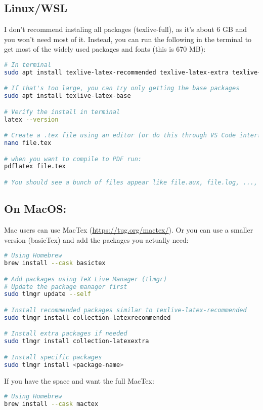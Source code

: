 \documentclass[12pt]{article}
\begin{document}
\subsection{Linux/WSL}
I don't recommend instaling all packages (texlive-full), as it's about 6 GB and you won't need most of it. Instead, you can run the following in the terminal to get most of the widely used packages and fonts (this is 670 MB):
\begin{lstlisting}[language=bash]
# In terminal
sudo apt install texlive-latex-recommended texlive-latex-extra texlive-fonts-recommended

# If that's too large, you can try only getting the base packages
sudo apt install texlive-latex-base

# Verify the install in terminal
latex --version

# Create a .tex file using an editor (or do this through VS Code interface)
nano file.tex

# when you want to compile to PDF run:
pdflatex file.tex

# You should see a bunch of files appear like file.aux, file.log, ..., you can ignore those, and just focus on file.pdf
\end{lstlisting}

\subsection{On MacOS:}
Mac users can use MacTex (\url{https://tug.org/mactex/}).
Or you can use a smaller version (basicTex) and add the packages you actually need:
\begin{lstlisting}[language=bash]
# Using Homebrew
brew install --cask basictex

# Add packages using TeX Live Manager (tlmgr)
# Update the package manager first
sudo tlmgr update --self

# Install recommended packages similar to texlive-latex-recommended
sudo tlmgr install collection-latexrecommended

# Install extra packages if needed
sudo tlmgr install collection-latexextra

# Install specific packages
sudo tlmgr install <package-name>
\end{lstlisting}
If you have the space and want the full MacTex:
\begin{lstlisting}[language=bash]
# Using Homebrew
brew install --cask mactex
\end{lstlisting}
\end{document}
